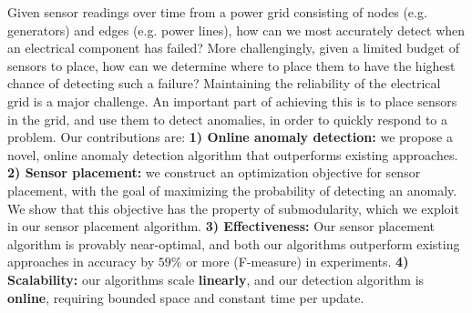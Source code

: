 Given sensor readings over time from a power grid consisting of nodes (e.g. generators) and edges (e.g. power lines), how can we most accurately detect when an electrical component has failed? More challengingly, given a limited budget of sensors to place, how can we determine where to place them to have the highest chance of detecting such a failure? Maintaining the reliability of the electrical grid is a major challenge. An important part of achieving this is to place sensors in the grid, and use them to detect anomalies, in order to quickly respond to a problem. Our contributions are: {\bf 1) Online anomaly detection:} we propose a novel, online anomaly detection algorithm that outperforms existing approaches. {\bf 2) Sensor placement:} we construct an optimization objective for sensor placement, with the goal of maximizing the probability of detecting an anomaly. We show that this objective has the property of submodularity, which we exploit in our sensor placement algorithm. {\bf 3) Effectiveness:} Our sensor placement algorithm is provably near-optimal, and both our algorithms outperform existing approaches in accuracy by $59\%$ or more (F-measure) in experiments. {\bf 4) Scalability:} our algorithms scale {\bf linearly}, and our detection algorithm is {\bf online}, requiring bounded space and constant time per update.